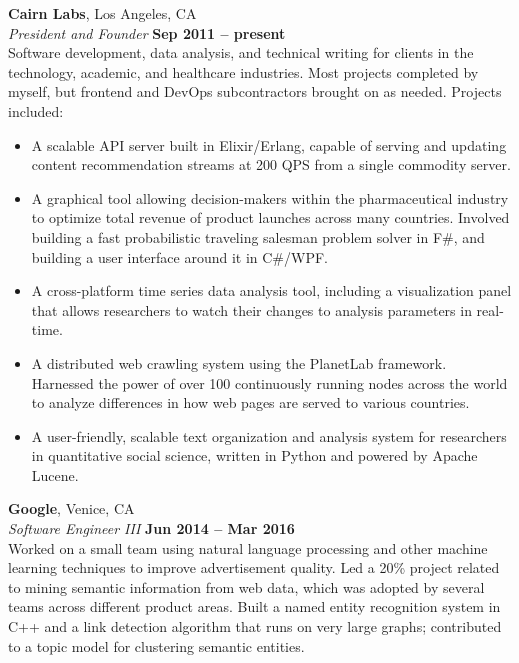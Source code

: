 \documentclass[margin,line]{resume}
\begin{document}
\begin{resume}
    \textbf{Cairn Labs}, Los Angeles, CA \vspace{2mm}\\\vspace{1mm}%
    \textsl{President and Founder} \hfill \textbf{Sep 2011 -- present}\\
    Software development, data analysis, and technical writing for clients in the technology, academic, and healthcare industries. Most projects completed by myself, but frontend and DevOps subcontractors brought on as needed. Projects included:
    \begin{itemize}
        \item A scalable API server built in Elixir/Erlang, capable of serving and updating content recommendation streams at 200 QPS from a single commodity server.
        \item A graphical tool allowing decision-makers within the pharmaceutical industry to optimize total revenue of product launches across many countries. Involved building a fast probabilistic traveling salesman problem solver in F\#, and building a user interface around it in C\#/WPF.
        \item A cross-platform time series data analysis tool, including a visualization panel that allows researchers to watch their changes to analysis parameters in real-time.
        \item A distributed web crawling system using the PlanetLab framework. Harnessed the power of over 100 continuously running nodes across the world to analyze differences in how web pages are served to various countries.
        \item A user-friendly, scalable text organization and analysis system for researchers in quantitative social science, written in Python and powered by Apache Lucene.
    \end{itemize}

    \textbf{Google}, Venice, CA \vspace{2mm}\\\vspace{1mm}%
    \textsl{Software Engineer III} \hfill \textbf{Jun 2014 -- Mar 2016}\\
    Worked on a small team using natural language processing and other machine learning techniques to improve advertisement quality. Led a 20\% project related to mining semantic information from web data, which was adopted by several teams across different product areas. Built a named entity recognition system in C++ and a link detection algorithm that runs on very large graphs; contributed to a topic model for clustering semantic entities.


\end{resume}
\end{document}
